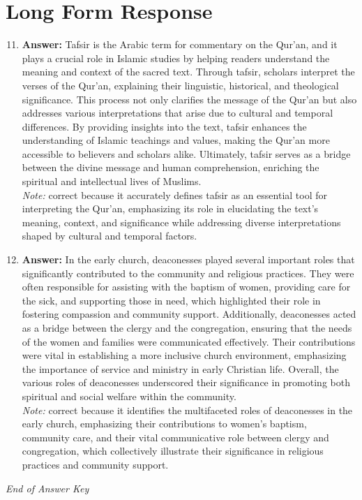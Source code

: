 \documentclass[12pt]{article}
\begin{document}
\section*{Long Form Response}
\begin{enumerate}[label=\arabic*.]
\setcounter{enumi}{10}
\item \textbf{Answer:} Tafsir is the Arabic term for commentary on the Qur'an, and it plays a crucial role in Islamic studies by helping readers understand the meaning and context of the sacred text. Through tafsir, scholars interpret the verses of the Qur'an, explaining their linguistic, historical, and theological significance. This process not only clarifies the message of the Qur'an but also addresses various interpretations that arise due to cultural and temporal differences. By providing insights into the text, tafsir enhances the understanding of Islamic teachings and values, making the Qur'an more accessible to believers and scholars alike. Ultimately, tafsir serves as a bridge between the divine message and human comprehension, enriching the spiritual and intellectual lives of Muslims.
\\ \textit{Note:} correct because it accurately defines tafsir as an essential tool for interpreting the Qur'an, emphasizing its role in elucidating the text's meaning, context, and significance while addressing diverse interpretations shaped by cultural and temporal factors.
\item \textbf{Answer:} In the early church, deaconesses played several important roles that significantly contributed to the community and religious practices. They were often responsible for assisting with the baptism of women, providing care for the sick, and supporting those in need, which highlighted their role in fostering compassion and community support. Additionally, deaconesses acted as a bridge between the clergy and the congregation, ensuring that the needs of the women and families were communicated effectively. Their contributions were vital in establishing a more inclusive church environment, emphasizing the importance of service and ministry in early Christian life. Overall, the various roles of deaconesses underscored their significance in promoting both spiritual and social welfare within the community.
\\ \textit{Note:} correct because it identifies the multifaceted roles of deaconesses in the early church, emphasizing their contributions to women's baptism, community care, and their vital communicative role between clergy and congregation, which collectively illustrate their significance in religious practices and community support.
\end{enumerate}

\vfill
\noindent\textit{End of Answer Key}
\end{document}

